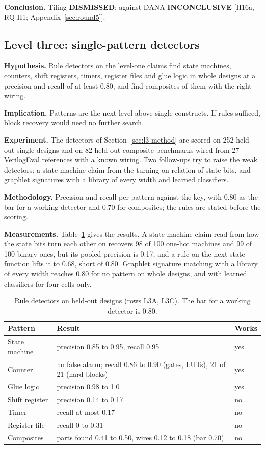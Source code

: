 \documentclass[conference]{IEEEtran}
\newcommand{\verdict}[1]{\textbf{\textsc{#1}}}
\newcommand{\hev}[1]{\par\smallskip\noindent\textbf{#1}}
\begin{document}
\hev{Conclusion.} Tiling \verdict{DISMISSED}; against DANA \verdict{INCONCLUSIVE} [H16a, RQ-H1; Appendix~\ref{sec:round5}].

\subsection{Level three: single-pattern detectors}
\label{arg:ra8}
\label{sec:res-l3a}

\hev{Hypothesis.} Rule detectors on the level-one claims find state machines, counters, shift registers, timers, register files and glue logic in whole designs at a precision and recall of at least 0.80, and find composites of them with the right wiring.

\hev{Implication.} Patterns are the next level above single constructs. If rules sufficed, block recovery would need no further search.

\hev{Experiment.} The detectors of Section~\ref{sec:l3-method} are scored on 252 held-out single designs and on 82 held-out composite benchmarks wired from 27 VerilogEval references with a known wiring. Two follow-ups try to raise the weak detectors: a state-machine claim from the turning-on relation of state bits, and graphlet signatures with a library of every width and learned classifiers.

\hev{Methodology.} Precision and recall per pattern against the key, with 0.80 as the bar for a working detector and 0.70 for composites; the rules are stated before the scoring.

\hev{Measurements.} Table~\ref{tab:l3-detectors} gives the results. A state-machine claim read from how the state bits turn each other on recovers 98 of 100 one-hot machines and 99 of 100 binary ones, but its pooled precision is 0.17, and a rule on the next-state function lifts it to 0.68, short of 0.80. Graphlet signature matching with a library of every width reaches 0.80 for no pattern on whole designs, and with learned classifiers for four cells only.

\begin{table}[t]
\caption{Rule detectors on held-out designs (rows L3A, L3C). The bar for a working detector is 0.80.}
\label{tab:l3-detectors}
\centering
\footnotesize
\begin{tabular}{@{}p{}p{}p{}@{}}
\toprule
Pattern & Result & Works \\
\midrule
State machine & precision 0.85 to 0.95, recall 0.95 & yes \\
Counter & no false alarm; recall 0.86 to 0.90 (gates, LUTs), 21 of 21 (hard blocks) & yes \\
Glue logic & precision 0.98 to 1.0 & yes \\
Shift register & precision 0.14 to 0.17 & no \\
Timer & recall at most 0.17 & no \\
Register file & recall 0 to 0.31 & no \\
Composites & parts found 0.41 to 0.50, wires 0.12 to 0.18 (bar 0.70) & no \\
\bottomrule
\end{tabular}
\end{table}
\end{document}
